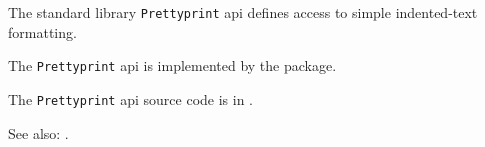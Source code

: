 
The standard library {\tt Prettyprint} api defines access to simple indented-text formatting.

The {\tt Prettyprint} api is implemented by the  package.

The {\tt Prettyprint} api source code is in .

See also: .


